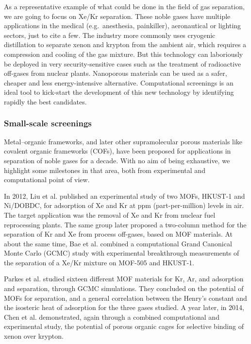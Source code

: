 \documentclass[main.tex]{subfiles}
\begin{document}
As a representative example of what could be done in the field of gas separation, we are going to focus on Xe/Kr separation. These noble gases have multiple applications in the medical (e.g.\ anesthesia, painkiller),\cite{cullen1951anesthetic, holstrater2011intranasal} aeronautical\cite{Patterson_2002,Coxhill_2005} or lighting sectors,\cite{Jarman_1974,Tanaka_2019} just to cite a few. The industry more commonly uses cryogenic distillation to separate xenon and krypton from the ambient air, which requires a compression and cooling of the gas mixture. But this technology can laboriously be deployed in very security-sensitive cases such as the treatment of radioactive off-gases from nuclear plants. Nanoporous materials can be used as a safer, cheaper and less energy-intensive alternative. Computational screenings is an ideal tool to kick-start the development of this new technology by identifying rapidly the best candidates.

\subsubsection{Small-scale screenings}

Metal--organic frameworks, and later other supramolecular porous materials like covalent organic frameworks (COFs), have been proposed for applications in separation of noble gases for a decade. With no aim of being exhaustive, we highlight some milestones in that area, both from experimental and computational point of view.

In 2012, Liu et al.\cite{Liu_2012} published an experimental study of two MOFs, HKUST-1 and Ni/DOBDC, for adsorption of Xe and Kr at ppm (part-per-million) levels in air. The target application was the removal of Xe and Kr from nuclear fuel reprocessing plants. The same group later proposed a two-column method for the separation of Kr and Xe from process off-gases\cite{Liu_2014}, based on MOF materials. At about the same time, Bae et al.\cite{Bae_2013} combined a computational Grand Canonical Monte Carlo (GCMC) study with experimental breakthrough measurements of the separation of a Xe/Kr mixture on MOF-505 and HKUST-1.

Parkes et al.\cite{Parkes_2013} studied sixteen different MOF materials for Kr, Ar, and  adsorption and separation, through GCMC simulations. They concluded on the potential of MOFs for separation, and a general correlation between the Henry's constant and the isosteric heat of adsorption for the three gases studied. A year later, in 2014, Chen et al.\cite{Chen_2014} demonstrated, again through a combined computational and experimental study, the potential of porous organic cages for selective binding of xenon over krypton.
\end{document}
